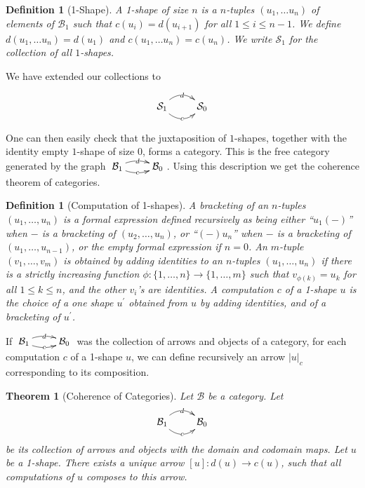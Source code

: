 \documentclass{article}
\numberwithin{equation}{section}
\theoremstyle{definition}
\theoremstyle{plain}
\newtheorem{theorem}[equation]{Theorem}
\newtheorem{definition}[equation]{Definition}
\begin{document}
\begin{definition}[1-Shape] A 1-shape of size $n$ is a $n$-tuples $(u_1, \dots u_n)$ of elements of $\mathcal{B}_1$ such that $c(u_i) = d(u_{i+1})$ for all $1 \le i \le n-1$. We define $d(u_1, \dots u_n) = d(u_1)$ and $c(u_1, \dots u_n) = c(u_n)$. We write $\mathcal{S}_1$ for the collection of all $1$-shapes.
\end{definition}

We have extended our collections to

\[\xymatrix{\mathcal{S}_1 \ar@/^1pc/[r]|d \ar@/_1pc/[r]|c & \mathcal{S}_0 }\]

One can then easily check that the juxtaposition of $1$-shapes, together with the identity empty $1$-shape of size $0$, forms a category. This is the free category generated by the graph $\xymatrix{\mathcal{B}_1 \ar@/^/[r]|d \ar@/_/[r]|c & \mathcal{B}_0 }$. Using this description we get the coherence theorem of categories.

\begin{definition}[Computation of 1-shapes] A \textnormal{bracketing} of an $n$-tuples $(u_1, \dots, u_n)$ is a formal expression defined recursively as being either ``$u_1(-)$'' when $-$ is a bracketing of $(u_2, \dots, u_n)$, or ``$(-)u_n$'' when $-$ is a bracketing of $(u_1, \dots, u_{n-1})$, or the empty formal expression if $n=0$. An $m$-tuple $(v_1, \dots, v_m)$ is obtained by \textnormal{adding identities} to an $n$-tuples $(u_1, \dots, u_n)$ if there is a strictly increasing function $\phi: \{1, \dots, n\} \to \{1, \dots, m\}$ such that $v_{\phi(k)} = u_k$ for all $1 \le k \le n$, and the other $v_i$'s are identities. A \textnormal{computation} $c$ of a 1-shape $u$ is the choice of a one shape $u^{\prime}$ obtained from $u$ by adding identities, and of a bracketing of $u^{\prime}$.
\end{definition}

If $\xymatrix{\mathcal{B}_1 \ar@/^/[r]|d \ar@/_/[r]|c & \mathcal{B}_0 }$ was the collection of arrows and objects of a category, for each computation $c$ of a 1-shape $u$, we can define recursively an arrow $|u|_c$ corresponding to its composition.

\begin{theorem}[Coherence of Categories] Let $\mathcal{B}$ be a category. Let
	\[\xymatrix{\mathcal{B}_1 \ar@/^1pc/[r]|d \ar@/_1pc/[r]|c & \mathcal{B}_0 }\]
	be its collection of arrows and objects with the domain and codomain maps. Let $u$ be a 1-shape. There exists a unique arrow $[u]: d(u) \to c(u)$, such that all computations of $u$ composes to this arrow.
\end{theorem}
\end{document}
